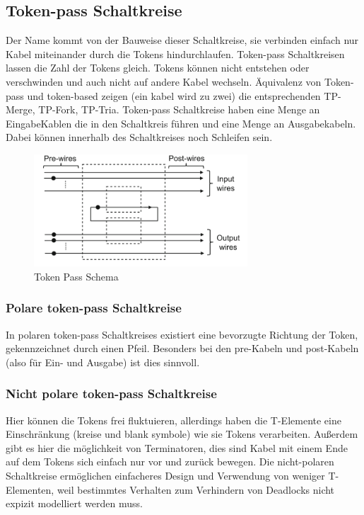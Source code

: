 \subsection{Token-pass Schaltkreise}
Der Name kommt von der Bauweise dieser Schaltkreise, sie verbinden einfach nur Kabel 
miteinander durch die Tokens hindurchlaufen.
%
Token-pass Schaltkreisen lassen die Zahl der Tokens gleich.
%
Tokens können nicht entstehen oder verschwinden und auch 
nicht auf andere Kabel wechseln.
%
Äquivalenz von Token-pass und token-based zeigen (ein kabel wird zu zwei)
die entsprechenden TP-Merge, TP-Fork, TP-Tria.
%
Token-pass Schaltkreise haben eine Menge an EingabeKablen die in
den Schaltkreis führen und eine Menge an Ausgabekabeln.
%
Dabei können innerhalb des Schaltkreises
noch Schleifen sein. 
%

\begin{figure}[h]
    \centering
    \includegraphics[width=8cm]{bilder/TokenPassScheme.png}
    \caption{Token Pass Schema}
\end{figure} 

\subsubsection{Polare token-pass Schaltkreise}
In polaren token-pass Schaltkreises existiert eine bevorzugte Richtung
der Token, gekennzeichnet durch einen Pfeil.
%
Besonders bei den pre-Kabeln und post-Kabeln (also für Ein- und Ausgabe)
ist dies sinnvoll.

\subsubsection{Nicht polare token-pass Schaltkreise}
Hier können die Tokens frei fluktuieren, allerdings haben die T-Elemente eine
Einschränkung (kreise und blank symbole) wie sie Tokens verarbeiten.
%
Außerdem gibt es hier die möglichkeit von Terminatoren, dies sind Kabel
mit einem Ende auf dem Tokens sich einfach nur vor und zurück bewegen.
%
Die nicht-polaren Schaltkreise ermöglichen einfacheres Design und Verwendung
von weniger T-Elementen, weil bestimmtes Verhalten zum Verhindern von
Deadlocks nicht expizit modelliert werden muss.

